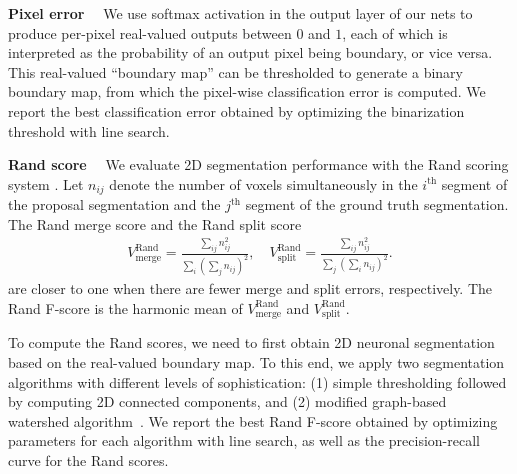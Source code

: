\documentclass{article} %
\begin{document}
{\bf Pixel error}$\quad$
We use softmax activation in the output layer of our nets to produce per-pixel real-valued outputs between $0$ and $1$, each of which is interpreted as the probability of an output pixel being boundary, or vice versa. This real-valued ``boundary map'' can be thresholded to generate a binary boundary map, from which the pixel-wise classification error is computed. We report the best classification error obtained by optimizing the binarization threshold with line search.

{\bf Rand score}$\quad$
We evaluate 2D segmentation performance with the Rand scoring system \cite{Rand1971,Unnikrishnan2007}. Let $n_{ij}$ denote the number of voxels simultaneously in the $i^\text{th}$ segment of the proposal segmentation and the $j^\text{th}$ segment of the ground truth segmentation. The Rand merge score and the Rand split score \begin{align*}
  V^\text{Rand}_\text{merge} = \frac{\sum_{ij}n_{ij}^2}{\sum_i(\sum_j n_{ij})^2},\quad
  V^\text{Rand}_\text{split} = \frac{\sum_{ij}n_{ij}^2}{\sum_j(\sum_i n_{ij})^2}.
\end{align*}
are closer to one when there are fewer merge and split errors, respectively. The Rand F-score is the harmonic mean of $V^\text{Rand}_\text{merge}$ and $V^\text{Rand}_\text{split}$.


To compute the Rand scores, we need to first obtain 2D neuronal segmentation based on the real-valued boundary map. To this end, we apply two segmentation algorithms with different levels of sophistication: (1) simple thresholding followed by computing 2D connected components, and (2) modified graph-based watershed algorithm~\cite{Zlateski2015}. We report the best Rand F-score obtained by optimizing parameters for each algorithm with line search, as well as the precision-recall curve for the Rand scores.
\end{document}
